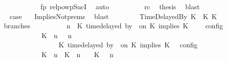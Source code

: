 \begin{isabellebody}
\ \ \ \ \ \ \ \ \ \ \isamarkupfalse%
\ fp\ relpowp{\isacharunderscore}Suc{\isacharunderscore}I{}\ \isamarkupfalse%
\ auto\isanewline
\ \ \ \ \ \ \ \ \isamarkupfalse%
\ rc\ \isamarkupfalse%
\ {\isacharquery}thesis\ \isamarkupfalse%
\ blast\isanewline
\ \ \ \ \ \ \isamarkupfalse%
\isanewline
\ \ \ \ \ \ \isamarkupfalse%
\ \isamarkupfalse%
\ {\isacharquery}case\ \ \isamarkupfalse%
\ ImpliesNot{\isachardot}prems{\isacharparenleft}{}{\isacharparenright}\ \isamarkupfalse%
\ blast\isanewline
\ \ \isamarkupfalse%
\isanewline
\ \ \ \ \isamarkupfalse%
\ {\isacharparenleft}TimeDelayedBy\ K\ {\isasymdelta}{\isasymtau}\ K\ K\isanewline
\ \ \ \ \ \ \isamarkupfalse%
\ branches{\isacharcolon}\isanewline
\ \ \ \ \ \ \ \ {\isacartoucheopen}{\isasymlbrakk}\ {\isasymGamma}{\isacharcomma}\ n\ {\isasymturnstile}\ {\isacharparenleft}{\isacharparenleft}K\ time{\isacharminus}delayed\ by\ {\isasymdelta}{\isasymtau}\ on\ K\ implies\ K\ {\isacharhash}\ {\isasymPsi}{\isacharparenright}\ {\isasymtriangleright}\ {\isasymPhi}\ {\isasymrbrakk}\isactrlsub c\isactrlsub o\isactrlsub n\isactrlsub f\isactrlsub i\isactrlsub g\isanewline
\ \ \ \ \ \ \ \ \ \ {\isacharequal}\ {\isasymlbrakk}\ {\isacharparenleft}{\isacharparenleft}K\ {\isasymnot}{\isasymUp}\ n{\isacharparenright}\ {\isacharhash}\ {\isasymGamma}{\isacharparenright}{\isacharcomma}\ n\isanewline
\ \ \ \ \ \ \ \ \ \ \ \ \ \ {\isasymturnstile}\ {\isasymPsi}\ {\isasymtriangleright}\ {\isacharparenleft}{\isacharparenleft}K\ time{\isacharminus}delayed\ by\ {\isasymdelta}{\isasymtau}\ on\ K\ implies\ K\ {\isacharhash}\ {\isasymPhi}{\isacharparenright}\ {\isasymrbrakk}\isactrlsub c\isactrlsub o\isactrlsub n\isactrlsub f\isactrlsub i\isactrlsub g\isanewline
\ \ \ \ \ \ \ \ \ \ {\isasymunion}\ {\isasymlbrakk}\ {\isacharparenleft}{\isacharparenleft}K\ {\isasymUp}\ n{\isacharparenright}\ {\isacharhash}\ {\isacharparenleft}K\ {\isacharat}\ n\ {\isasymoplus}\ {\isasymdelta}{\isasymtau}\ {\isasymRightarrow}\ K\ {\isacharhash}\ {\isasymGamma}{\isacharparenright}{\isacharcomma}\ n\isanewline

\end{isabellebody}
